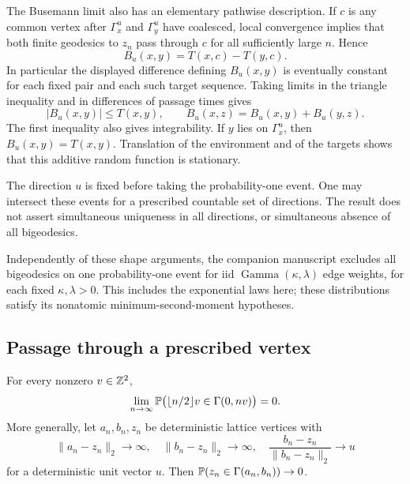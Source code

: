 The Busemann limit also has an elementary pathwise description. If $c$
is any common vertex after $\Gamma_x^u$ and $\Gamma_y^u$ have coalesced,
local convergence implies that both finite geodesics to $z_n$ pass
through $c$ for all sufficiently large $n$. Hence
\begin{equation}\label{eq:busemann-common-vertex}
 B_u(x,y)=T(x,c)-T(y,c).
\end{equation}
In particular the displayed difference defining $B_u(x,y)$ is eventually
constant for each fixed pair and each such target sequence. Taking limits
in the triangle inequality and in differences of passage times gives
\[
 |B_u(x,y)|\leq T(x,y),\qquad
 B_u(x,z)=B_u(x,y)+B_u(y,z).
\]
The first inequality also gives integrability. If $y$ lies on
$\Gamma_x^u$, then $B_u(x,y)=T(x,y)$. Translation of the environment and
of the targets shows that this additive random function is stationary.

The direction $u$ is fixed before taking the probability-one event.
One may intersect these events for a prescribed countable set of
directions. The result does not assert simultaneous uniqueness in all
directions, or simultaneous absence of all bigeodesics.

Independently of these shape arguments, the companion manuscript
\cite[Theorem~1.1]{OpenAINoBigeodesics2026} excludes all bigeodesics on one
probability-one event for iid $\operatorname{Gamma}(\kappa,\lambda)$ edge
weights, for each fixed $\kappa,\lambda>0$. This includes the exponential
laws here; these distributions satisfy its nonatomic minimum-second-moment
hypotheses.

\subsection{Passage through a prescribed vertex}

\begin{corollary}\label{cor:midpoint}
For every nonzero $v\in\mathbb Z^2$,
\[
 \lim_{n\to\infty}
 \mathbb P\bigl(\lfloor n/2\rfloor v\in\Gamma(0,nv)\bigr)=0.
\]
More generally, let $a_n,b_n,z_n$ be deterministic lattice vertices with
\[
 \lVert a_n-z_n\rVert_2\to\infty,
 \quad\lVert b_n-z_n\rVert_2\to\infty,
 \quad
 \frac{b_n-z_n}{\lVert b_n-z_n\rVert_2}\longrightarrow u
\]
for a deterministic unit vector $u$. Then
$\mathbb P(z_n\in\Gamma(a_n,b_n))\to0$.
\end{corollary}

